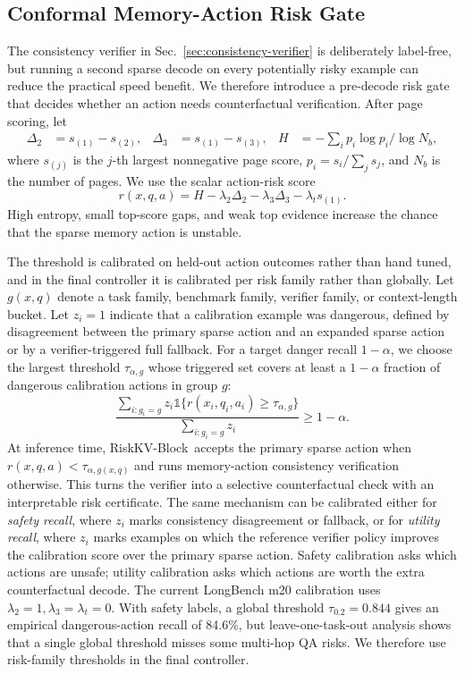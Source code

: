 \documentclass{article}
\newcommand{\method}{RiskKV-Block}
\begin{document}
\subsection{Conformal Memory-Action Risk Gate}

The consistency verifier in Sec.~\ref{sec:consistency-verifier} is deliberately label-free, but running a second sparse decode on every potentially risky example can reduce the practical speed benefit.
We therefore introduce a pre-decode risk gate that decides whether an action needs counterfactual verification.
After page scoring, let
\begin{align}
    \Delta_2 &= s_{(1)} - s_{(2)}, &
    \Delta_3 &= s_{(1)} - s_{(3)}, &
    H &= -\sum_i p_i \log p_i / \log N_b,
\end{align}
where $s_{(j)}$ is the $j$-th largest nonnegative page score, $p_i=s_i/\sum_j s_j$, and $N_b$ is the number of pages.
We use the scalar action-risk score
\begin{equation}
    r(x,q,a)
    =
    H
    - \lambda_2 \Delta_2
    - \lambda_3 \Delta_3
    - \lambda_t s_{(1)}.
    \label{eq:conformal-risk-score}
\end{equation}
High entropy, small top-score gaps, and weak top evidence increase the chance that the sparse memory action is unstable.

The threshold is calibrated on held-out action outcomes rather than hand tuned, and in the final controller it is calibrated per risk family rather than globally.
Let $g(x,q)$ denote a task family, benchmark family, verifier family, or context-length bucket.
Let $z_i=1$ indicate that a calibration example was dangerous, defined by disagreement between the primary sparse action and an expanded sparse action or by a verifier-triggered full fallback.
For a target danger recall $1-\alpha$, we choose the largest threshold $\tau_{\alpha,g}$ whose triggered set covers at least a $1-\alpha$ fraction of dangerous calibration actions in group $g$:
\begin{equation}
    \frac{\sum_{i:g_i=g} z_i \mathbb{1}\{r(x_i,q_i,a_i)\geq \tau_{\alpha,g}\}}
         {\sum_{i:g_i=g} z_i}
    \geq
    1-\alpha.
    \label{eq:conformal-risk-threshold}
\end{equation}
At inference time, \method\ accepts the primary sparse action when $r(x,q,a)<\tau_{\alpha,g(x,q)}$ and runs memory-action consistency verification otherwise.
This turns the verifier into a selective counterfactual check with an interpretable risk certificate.
The same mechanism can be calibrated either for \emph{safety recall}, where $z_i$ marks consistency disagreement or fallback, or for \emph{utility recall}, where $z_i$ marks examples on which the reference verifier policy improves the calibration score over the primary sparse action.
Safety calibration asks which actions are unsafe; utility calibration asks which actions are worth the extra counterfactual decode.
The current LongBench m20 calibration uses $\lambda_2=1,\lambda_3=\lambda_t=0$.
With safety labels, a global threshold $\tau_{0.2}=0.844$ gives an empirical dangerous-action recall of 84.6\%, but leave-one-task-out analysis shows that a single global threshold misses some multi-hop QA risks.
We therefore use risk-family thresholds in the final controller.
\end{document}
